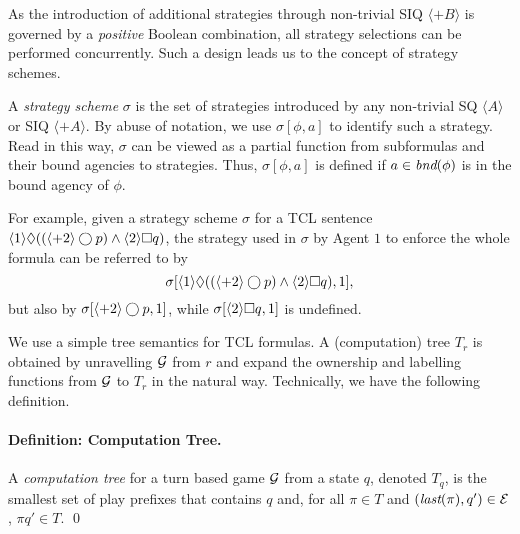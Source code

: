 As the introduction of additional strategies through non-trivial SIQ $\langle +B\rangle$ is governed by a \emph{positive} 
Boolean combination, all strategy selections can be performed concurrently.
Such a design leads us to the concept of strategy schemes.

A {\em strategy scheme} $\sigma$ is the set of strategies introduced by any non-trivial SQ $\langle A \rangle$ or SIQ $\langle + A \rangle$.
By abuse of notation, we use $\sigma[\phi,a]$ to identify such a strategy.
Read in this way, $\sigma$ can be viewed as a partial function from subformulas and their bound agencies to strategies.
Thus, $\sigma[\phi,a]$ is defined if $a\in \textit{bnd}(\phi)$ is in the bound agency of $\phi$.


For example, given a strategy scheme $\sigma$ for a 
TCL sentence $\langle 1\rangle \Diamond ((\langle+2\rangle \bigcirc p)\wedge\langle 2\rangle\Box q)$, 
the strategy used in $\sigma$ by Agent $1$ to enforce 
the whole formula can be referred to by
\[\sigma[\langle 1\rangle \Diamond ((\langle+2\rangle \bigcirc p)\wedge\langle 2\rangle\Box q),1],\]
but also by $\sigma[\langle+2\rangle \bigcirc p,1]$, while $\sigma[\langle 2\rangle\Box q,1]$ is undefined.


We use a simple tree semantics for TCL formulas. 
A (computation) tree $T_r$ is obtained by unravelling ${\cal G}$ from $r$  
and expand the ownership 
and labelling functions from ${\cal G}$ to $T_r$ in the natural way.
Technically, we have the following definition.  

\paragraph{\bf Definition: Computation Tree.} 
A {\em computation tree} for a turn based game ${\cal G}$ from a state $q$, 
denoted $T_q$, is the smallest set of play prefixes that contains $q$ and, for all $\pi\in T$ and $(\textit{last}(\pi),q')\in {\cal E}$, $\pi q'\in T$.
\qed 


